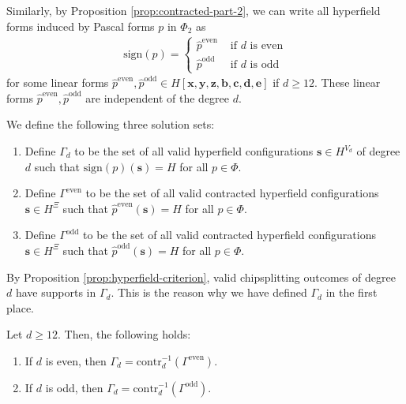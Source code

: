 Similarly, by Proposition \ref{prop:contracted-part-2}, we can write all hyperfield forms induced by Pascal forms \( p \) in \( \Phi_2 \) as
\begin{align*}
    \mathrm{sign}(p) = \begin{cases}
        \hat p^{\mathrm{even}} & \text{ if } d \text{ is even} \\
        \hat p^{\mathrm{odd}} & \text{ if } d \text{ is odd}
    \end{cases}
\end{align*}
for some linear forms \( \hat p^{\mathrm{even}}, \hat p^{\mathrm{odd}} \in H[\mathbf{x}, \mathbf{y}, \mathbf{z}, \mathbf{b}, \mathbf{c}, \mathbf{d}, \mathbf{e}] \) if \( d \geq 12 \). These linear forms \( \hat p^{\mathrm{even}}, \hat p^{\mathrm{odd}}  \) are independent of the degree \( d \).

\begin{definition}
    We define the following three solution sets:
    \begin{enumerate}
        \item     Define \( \Gamma_d \) to be the set of all valid hyperfield configurations \( \mathbf{s} \in H^{V_d} \) of degree \( d \) such that \( \mathrm{sign}(p)(\mathbf{s}) = H \) for all \( p \in \Phi \).

        \item     Define \( \Gamma^{\mathrm{even}} \) to be the set of all valid contracted hyperfield configurations \( \mathbf{s} \in H^{\Xi} \) such that \( \hat p^{\mathrm{even}}(\mathbf{s}) = H \) for all \( p \in \Phi \).

        \item     Define \( \Gamma^{\mathrm{odd}} \) to be the set of all valid contracted hyperfield configurations \( \mathbf{s} \in H^{\Xi} \) such that \( \hat p^{\mathrm{odd}}(\mathbf{s}) = H \) for all \( p \in \Phi \).
    \end{enumerate}
\end{definition}

By Proposition \ref{prop:hyperfield-criterion}, valid chipsplitting outcomes of degree \( d \) have supports in \( \Gamma_d \). This is the reason why we have defined \( \Gamma_d \) in the first place. 

\begin{proposition}
    Let \( d \geq 12 \). Then, the following holds:
    \begin{enumerate}
        \item If \( d \) is even, then \( \Gamma_d = \mathrm{contr}_d^{-1}(\Gamma^{\mathrm{even}}) \).
       \item If \( d \) is odd, then \( \Gamma_d = \mathrm{contr}_d^{-1}(\Gamma^{\mathrm{odd}}) \).
    \end{enumerate}
\end{proposition}

